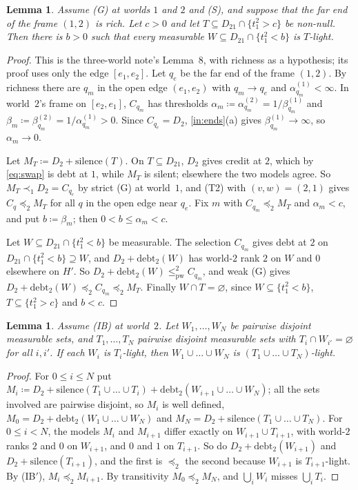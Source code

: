 \documentclass[11pt]{article}
\newtheorem{lemma}[theorem]{Lemma}
\theoremstyle{definition}\newtheorem{definition}[theorem]{Definition}
\theoremstyle{remark}\newtheorem{remark}[theorem]{Remark}
\newcommand{\debt}{\mathrm{debt}}
\newcommand{\sil}{\mathrm{silence}}
\newcommand{\pw}{\mathrm{pw}}
\begin{document}
\begin{lemma}\label{lem:near}
Assume (G) at worlds $1$ and $2$ and (S), and suppose that the far end of
the frame $(1,2)$ is rich. Let $c>0$ and let $T\subseteq D_{21}\cap
\{t^2_1>c\}$ be non-null. Then there is $b>0$ such that every measurable
$W\subseteq D_{21}\cap\{t^2_1<b\}$ is $T$-light.
\end{lemma}
\begin{proof}
This is the three-world note's Lemma~8, with richness as a hypothesis; its
proof uses only the edge $[e_1,e_2]$. Let $q_e$ be the far end of the frame
$(1,2)$. By richness there are $q_m$ in the open edge $(e_1,e_2)$ with
$q_m\to q_e$ and $\alpha^{(1)}_{q_m}<\infty$. In world~$2$'s frame on
$[e_2,e_1]$, $C_{q_m}$ has thresholds
$\alpha_m\coloneqq\alpha^{(2)}_{q_m}=1/\beta^{(1)}_{q_m}$ and
$\beta_m\coloneqq\beta^{(2)}_{q_m}=1/\alpha^{(1)}_{q_m}>0$. Since
$C_{q_e}=D_2$, \ref{in:ends}(a) gives $\beta^{(1)}_{q_m}\to\infty$, so
$\alpha_m\to0$.

Let $M_T\coloneqq D_2+\sil(T)$. On $T\subseteq D_{21}$, $D_2$ gives credit
at $2$, which by \eqref{eq:swap} is debt at $1$, while $M_T$ is silent;
elsewhere the two models agree. So $M_T\prec_1D_2=C_{q_e}$ by strict (G)
at world~$1$, and (T2) with $(v,w)=(2,1)$ gives $C_q\preceq_2M_T$ for all $q$
in the open edge near $q_e$. Fix $m$ with $C_{q_m}\preceq_2M_T$ and
$\alpha_m<c$, and put $b\coloneqq\beta_m$; then $0<b\le\alpha_m<c$.

Let $W\subseteq D_{21}\cap\{t^2_1<b\}$ be measurable. The selection
$C_{q_m}$ gives debt at $2$ on $D_{21}\cap\{t^2_1<b\}\supseteq W$, and
$D_2+\debt_2(W)$ has world-$2$ rank $2$ on $W$ and $0$ elsewhere on $H'$.
So $D_2+\debt_2(W)\le^2_\pw C_{q_m}$, and weak (G) gives
$D_2+\debt_2(W)\preceq_2C_{q_m}\preceq_2M_T$. Finally $W\cap T=\varnothing$,
since $W\subseteq\{t^2_1<b\}$, $T\subseteq\{t^2_1>c\}$ and $b<c$.
\end{proof}

\begin{lemma}\label{lem:compose}
Assume (IB) at world~$2$. Let $W_1,\dots,W_N$ be pairwise disjoint
measurable sets, and $T_1,\dots,T_N$ pairwise disjoint measurable sets with
$T_i\cap W_{i'}=\varnothing$ for all $i,i'$. If each $W_i$ is $T_i$-light,
then $W_1\cup\dots\cup W_N$ is $(T_1\cup\dots\cup T_N)$-light.
\end{lemma}
\begin{proof}
For $0\le i\le N$ put
$M_i\coloneqq D_2+\sil(T_1\cup\dots\cup T_i)+\debt_2(W_{i+1}\cup\dots\cup
W_N)$; all the sets involved are pairwise disjoint, so $M_i$ is well
defined, $M_0=D_2+\debt_2(W_1\cup\dots\cup W_N)$ and
$M_N=D_2+\sil(T_1\cup\dots\cup T_N)$. For $0\le i<N$, the models $M_i$ and
$M_{i+1}$ differ exactly on $W_{i+1}\cup T_{i+1}$, with world-$2$ ranks $2$
and $0$ on $W_{i+1}$, and $0$ and $1$ on $T_{i+1}$. So do
$D_2+\debt_2(W_{i+1})$ and $D_2+\sil(T_{i+1})$, and the first is
$\preceq_2$ the second because $W_{i+1}$ is $T_{i+1}$-light. By (IB$'$),
$M_i\preceq_2M_{i+1}$. By transitivity $M_0\preceq_2M_N$, and
$\bigcup_iW_i$ misses $\bigcup_iT_i$.
\end{proof}
\end{document}
